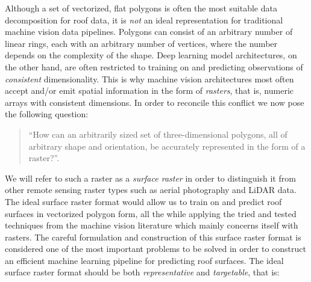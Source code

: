 Although a set of vectorized, flat polygons is often the most suitable data decomposition for roof data, it is \emph{not} an ideal representation for traditional machine vision data pipelines.
Polygons can consist of an arbitrary number of linear rings, each with an arbitrary number of vertices, where the number depends on the complexity of the shape.
Deep learning model architectures, on the other hand, are often restricted to training on and predicting observations of \emph{consistent} dimensionality.
This is why machine vision architectures most often accept and/or emit spatial information in the form of \emph{rasters}, that is, numeric arrays with consistent dimensions.
In order to reconcile this conflict we now pose the following question:
%
\begin{quotation}
  \enquote{How can an arbitrarily sized set of three-dimensional polygons, all of arbitrary shape and orientation, be accurately represented in the form of a raster?}.
\end{quotation}
%
We will refer to such a raster as a \textit{surface raster} in order to distinguish it from other remote sensing raster types such as aerial photography and LiDAR data.
The ideal surface raster format would allow us to train on and predict roof surfaces in vectorized polygon form, all the while applying the tried and tested techniques from the machine vision literature which mainly concerns itself with rasters.
The careful formulation and construction of this surface raster format is considered one of the most important problems to be solved in order to construct an efficient machine learning pipeline for predicting roof surfaces.
The ideal surface raster format should be both \emph{representative} and \emph{targetable}, that is:
